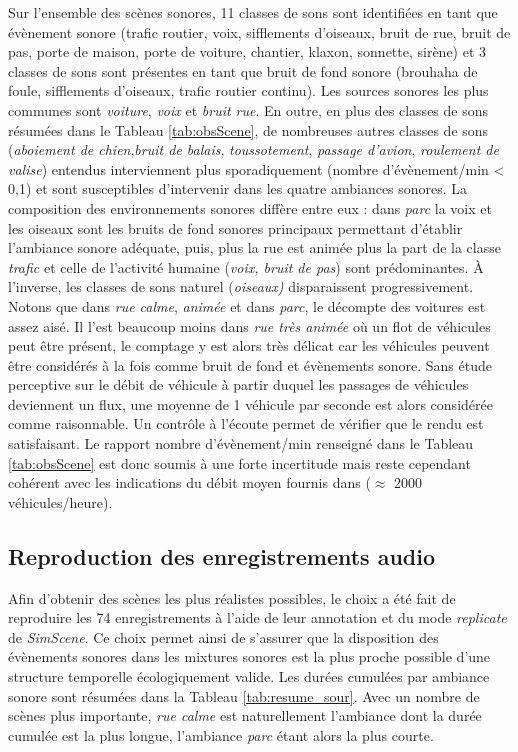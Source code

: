 Sur l'ensemble des scènes sonores, 11 classes de sons sont identifiées en tant que évènement sonore  (trafic routier, voix, sifflements d'oiseaux, bruit de rue, bruit de pas, porte de maison, porte de voiture, chantier, klaxon, sonnette, sirène) et 3 classes de sons sont présentes en tant que bruit de fond sonore (brouhaha de foule, sifflements d'oiseaux, trafic routier continu).
Les sources sonores les plus communes sont \textit{voiture}, \textit{voix} et \textit{bruit rue}. En outre, en plus des classes de sons résumées dans le Tableau \ref{tab:obsScene}, de nombreuses autres classes de sons (\textit{aboiement de chien},\textit{bruit de balais}, \textit{toussotement}, \textit{passage d'avion}, \textit{roulement de valise}) entendus interviennent plus sporadiquement (nombre d'évènement/min < 0,1) et sont susceptibles d'intervenir dans les quatre ambiances sonores.
La composition des environnements sonores diffère entre eux : dans \textit{parc} la voix et les oiseaux sont les bruits de fond sonores principaux permettant d'établir l'ambiance sonore adéquate, puis, plus la rue est animée plus la part de la classe \textit{trafic} et celle de l'activité humaine (\textit{voix, bruit de pas}) sont prédominantes. À l'inverse, les classes de sons \og naturel \fg{} (\textit{oiseaux)} disparaissent progressivement.
Notons que dans \textit{rue calme}, \textit{animée} et dans \textit{parc}, le décompte des voitures est assez aisé. Il l'est beaucoup moins dans \textit{rue très animée} où un flot de véhicules peut être présent, le comptage y est alors très délicat car les véhicules peuvent être considérés à la fois comme bruit de fond et évènements sonore.
Sans étude perceptive sur le débit de véhicule à partir duquel les passages de véhicules deviennent un flux, une moyenne de 1 véhicule par seconde est alors considérée comme raisonnable. Un contrôle à l'écoute permet de vérifier que le rendu est satisfaisant. Le rapport nombre d'évènement/min renseigné dans le Tableau \ref{tab:obsScene} est donc soumis à une forte incertitude mais reste cependant cohérent avec les indications du débit moyen fournis dans \cite{aumond2017modeling} ($\approx$ 2000 véhicules/heure). \\

\subsection{Reproduction des enregistrements audio}\label{section:reproductionScene}

Afin d'obtenir des scènes les plus réalistes possibles, le choix a été fait de reproduire les 74 enregistrements à l'aide de leur annotation et du mode \textit{replicate} de \textit{SimScene}. Ce choix permet ainsi de s'assurer que la disposition des évènements sonores dans les mixtures sonores est la plus proche possible d'une structure temporelle écologiquement valide. Les durées cumulées par ambiance sonore sont résumées dans la Tableau \ref{tab:resume_sour}. Avec un nombre de scènes plus importante, \textit{rue calme} est naturellement l'ambiance dont la durée cumulée est la plus longue, l'ambiance \textit{parc} étant alors la plus courte.

